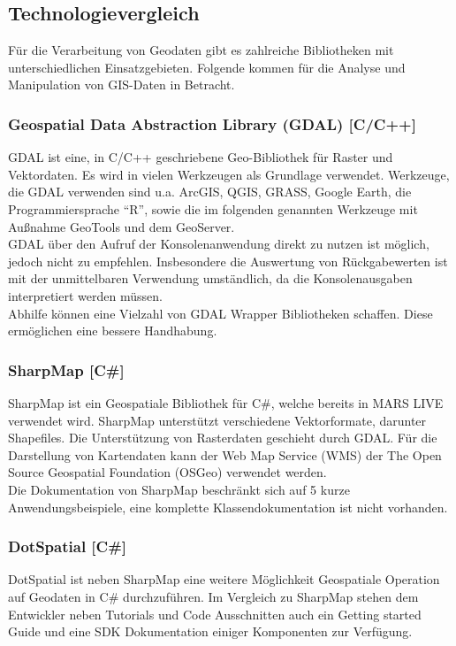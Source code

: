 \documentclass[10pt,conference,compsocconf]{IEEEtran}
\begin{document}
\subsection{Technologievergleich}
Für die Verarbeitung von Geodaten gibt es zahlreiche Bibliotheken mit unterschiedlichen Einsatzgebieten. Folgende kommen für die Analyse und Manipulation von GIS-Daten in Betracht.

\subsubsection{Geospatial Data Abstraction Library (GDAL) [C/C++]}
GDAL ist eine, in C/C++ geschriebene Geo-Bibliothek für Raster und Vektordaten. Es wird in vielen Werkzeugen als Grundlage verwendet. Werkzeuge, die GDAL verwenden sind u.a. ArcGIS, QGIS, GRASS, Google Earth, die Programmiersprache \enquote{R}, sowie die im folgenden genannten Werkzeuge mit Außnahme GeoTools und dem GeoServer.\\
GDAL über den Aufruf der Konsolenanwendung direkt zu nutzen ist möglich, jedoch nicht zu empfehlen. Insbesondere die Auswertung von Rückgabewerten ist mit der unmittelbaren Verwendung umständlich, da die Konsolenausgaben interpretiert werden müssen.\\
Abhilfe können eine Vielzahl von GDAL Wrapper Bibliotheken schaffen. Diese ermöglichen eine bessere Handhabung.

\subsubsection{SharpMap [C\#]}
SharpMap ist ein Geospatiale Bibliothek für C\#, welche bereits in MARS LIVE verwendet wird. SharpMap unterstützt verschiedene Vektorformate, darunter Shapefiles. Die Unterstützung von Rasterdaten geschieht durch GDAL. Für die Darstellung von Kartendaten kann der Web Map Service (WMS) der The Open Source Geospatial Foundation (OSGeo) verwendet werden.\\
Die Dokumentation von SharpMap beschränkt sich auf 5 kurze Anwendungsbeispiele, eine komplette Klassendokumentation ist nicht vorhanden.
	
\subsubsection{DotSpatial [C\#]}
DotSpatial ist neben SharpMap eine weitere Möglichkeit Geospatiale Operation auf Geodaten in C\# durchzuführen. Im Vergleich zu SharpMap stehen dem Entwickler neben Tutorials und Code Ausschnitten auch ein Getting started Guide und eine SDK Dokumentation einiger Komponenten zur Verfügung.
	
\end{document}
